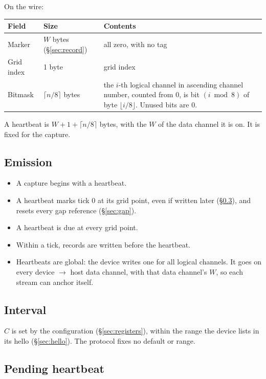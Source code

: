 \documentclass[11pt,a4paper]{article}
\newcommand{\sref}[1]{\S\ref{#1}}
\begin{document}
On the wire:

\begin{tabularx}{\linewidth}{@{}l l L@{}}
\toprule
\textbf{Field} & \textbf{Size} & \textbf{Contents} \\
\midrule
Marker & $W$ bytes (\sref{sec:record}) & all zero, with no tag \\
Grid index & 1 byte & grid index \\
Bitmask & $\lceil n/8 \rceil$ bytes & the $i$-th logical channel in ascending channel number, counted from 0, is bit $(i \bmod 8)$ of byte $\lfloor i/8 \rfloor$. Unused bits are 0. \\
\bottomrule
\end{tabularx}

A heartbeat is $W + 1 + \lceil n/8 \rceil$ bytes, with the $W$ of the data channel it
is on. It is fixed for the capture.

\subsection{Emission}\label{sec:emission}

\begin{itemize}
  \item A capture begins with a heartbeat.
  \item A heartbeat marks tick 0 at its grid point, even if written later
        (\sref{sec:pending}), and resets every gap reference (\sref{sec:gap}).
  \item A heartbeat is due at every grid point.
  \item Within a tick, records are written before the heartbeat.
  \item Heartbeats are global: the device writes one for all logical channels. It goes
        on every device $\to$ host data channel, with that data channel's $W$, so each
        stream can anchor itself.
\end{itemize}

\subsection{Interval}\label{sec:interval}

$C$ is set by the configuration (\sref{sec:registers}), within the range the device
lists in its hello (\sref{sec:hello}). The protocol fixes no default or range.

\subsection{Pending heartbeat}\label{sec:pending}
\end{document}
